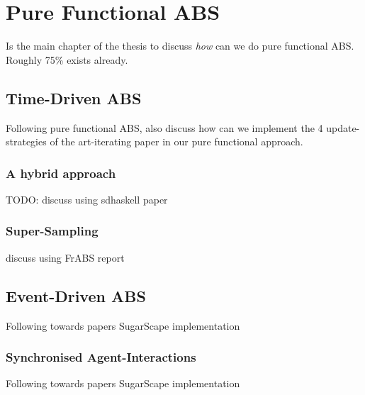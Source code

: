 \chapter{Pure Functional ABS}
Is the main chapter of the thesis to discuss \textit{how} can we do pure functional ABS. Roughly 75\% exists already.

\section{Time-Driven ABS}
Following pure functional ABS, also discuss how can we implement the 4 update-strategies of the art-iterating paper in our pure functional approach.

\subsection{A hybrid approach}
TODO: discuss using sdhaskell paper

\subsection{Super-Sampling}
discuss using FrABS report

\section{Event-Driven ABS}
Following towards papers SugarScape implementation
\subsection{Synchronised Agent-Interactions}
Following towards papers SugarScape implementation


